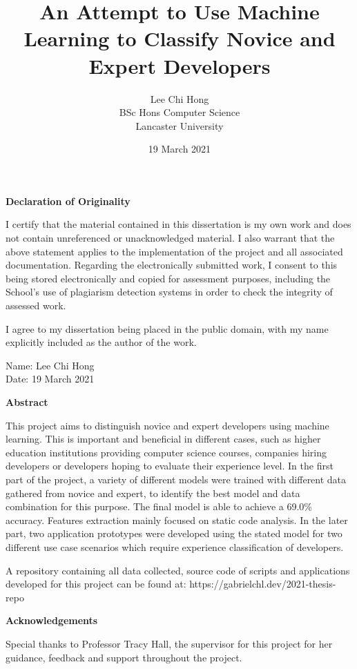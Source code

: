 \documentclass{report}
\title{An Attempt to Use Machine Learning to Classify Novice and Expert Developers}
\author{
    Lee Chi Hong\\
    BSc Hons Computer Science\\
    Lancaster University
}
\date{19 March 2021}
\begin{document}
\maketitle


\begin{center}
    \textbf{Declaration of Originality}
\end{center}
I certify that the material contained in this dissertation is my own work and does not contain unreferenced or unacknowledged material. I also warrant that the above statement applies to the implementation of the project and all associated documentation. Regarding the electronically submitted work, I consent to this being stored electronically and copied for assessment purposes, including the School’s use of plagiarism detection systems in order to check the integrity of assessed work.

I agree to my dissertation being placed in the public domain, with my name explicitly included as the author of the work.

Name: Lee Chi Hong\\
Date: 19 March 2021

\newpage

\begin{center}
    \textbf{Abstract}
\end{center}
This project aims to distinguish novice and expert developers using machine learning. This is important and beneficial in different cases, such as higher education institutions providing computer science courses, companies hiring developers or developers hoping to evaluate their experience level. In the first part of the project, a variety of different models were trained with different data gathered from novice and expert, to identify the best model and data combination for this purpose. The final model is able to achieve a 69.0\% accuracy. Features extraction mainly focused on static code analysis. In the later part, two application prototypes were developed using the stated model for two different use case scenarios which require experience classification of developers.

A repository containing all data collected, source code of scripts and applications developed for this project can be found at: https://gabrielchl.dev/2021-thesis-repo

\begin{center}
    \textbf{Acknowledgements}
\end{center}
Special thanks to Professor Tracy Hall, the supervisor for this project for her guidance, feedback and support throughout the project.
\end{document}
